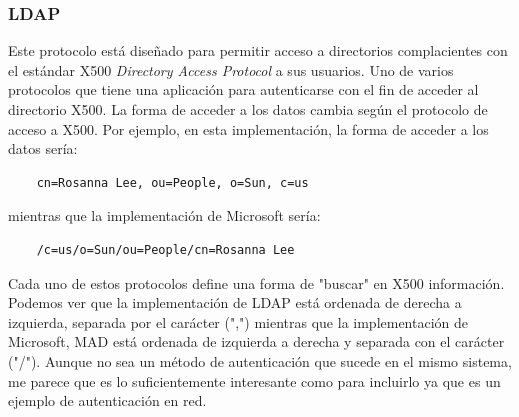 \documentclass[titlepage, 12pt, a4paper]{article}
\begin{document}
\subsubsection{\Gls{LDAP}}
Este protocolo está diseñado para permitir acceso a directorios complacientes con el estándar \Gls{X500} \textit{Directory Access Protocol} a sus usuarios. Uno de varios protocolos que tiene una aplicación para autenticarse con el fin de acceder al directorio \Gls{X500}\cite{LDAP}. La forma de acceder a los datos cambia según el protocolo de acceso a \Gls{X500}. Por ejemplo, en esta implementación, la forma de acceder a los datos sería:
\begin{verbatim}
	cn=Rosanna Lee, ou=People, o=Sun, c=us
\end{verbatim}
mientras que la implementación de Microsoft sería:
\begin{verbatim}
	/c=us/o=Sun/ou=People/cn=Rosanna Lee
\end{verbatim}
Cada uno de estos protocolos define una forma de "buscar" en \Gls{X500} información. Podemos ver que la implementación de \Gls{LDAP} está ordenada de derecha a izquierda, separada por el carácter (",") mientras que la implementación de Microsoft, \Gls{MAD} está ordenada de izquierda a derecha y separada con el carácter ("/").
Aunque no sea un método de autenticación que sucede en el mismo sistema, me parece que es lo suficientemente interesante como para incluirlo ya que es un ejemplo de autenticación en red.
\end{document}
